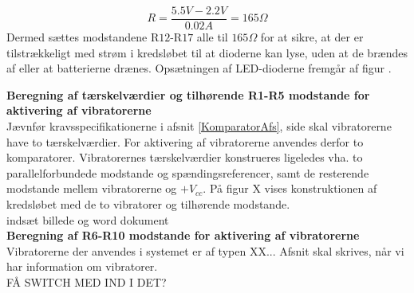 \begin{equation}
R = \dfrac{5.5V - 2.2V}{0.02A} = 165\Omega
\end{equation}
\noindent Dermed sættes modstandene R$12$-R$17$ alle til $165\Omega$ for at sikre, at der er tilstrækkeligt med strøm i kredsløbet til at dioderne kan lyse, uden at de brændes af eller at batterierne drænes. Opsætningen af LED-dioderne fremgår af figur .

\noindent\textbf{Beregning af tærskelværdier og tilhørende R1-R5 modstande for aktivering af  vibratorerne} \\
Jævnfør kravsspecifikationerne i afsnit \ref{KomparatorAfs}, side \pageref{KomparatorAfs} skal vibratorerne have to tærskelværdier. For aktivering af vibratorerne anvendes derfor to komparatorer. Vibratorernes tærskelværdier konstrueres ligeledes vha. to parallelforbundede modstande og spændingsreferencer, samt de resterende modstande mellem vibratorerne og $+V_{cc}$. På figur X vises konstruktionen af kredsløbet med de to vibratorer og tilhørende modstande. \\

indsæt billede og word dokument \\

\noindent\textbf{Beregning af R6-R10 modstande for aktivering af vibratorerne} \\
Vibratorerne der anvendes i systemet er af typen XX... Afsnit skal skrives, når vi har information om vibratorer.  \\

FÅ SWITCH MED IND I DET? \\

